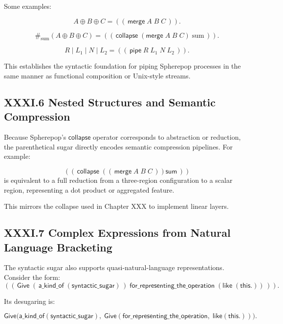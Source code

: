 \documentclass[11pt,letterpaper]{article}
\begin{document}
Some examples:

\[
A \oplus B \oplus C
=
((\,\mathsf{merge}\; A\; B\; C\,)).
\]

\[
\#_{\text{sum}}(A \oplus B \oplus C)
=
((\,\mathsf{collapse}\; (\mathsf{merge}\; A\; B\; C)\; \text{sum}\,)).
\]

\[
R \mid L_1 \mid N \mid L_2
=
((\,\mathsf{pipe}\; R\; L_1\; N\; L_2\,)).
\]

This establishes the syntactic foundation for piping Spherepop processes in the same manner as functional composition or Unix-style streams.

\subsection{XXXI.6 Nested Structures and Semantic Compression}

Because Spherepop's $\mathsf{collapse}$ operator corresponds to abstraction or reduction, the parenthetical sugar directly encodes semantic compression pipelines. For example:

\[
((\,\mathsf{collapse}\;
     ((\,\mathsf{merge}\; A\; B\; C\,))
     \mathsf{sum}\,))
\]
is equivalent to a full reduction from a three-region configuration to a scalar region, representing a dot product or aggregated feature.

This mirrors the collapse used in Chapter XXX to implement linear layers.

\subsection{XXXI.7 Complex Expressions from Natural Language Bracketing}

The syntactic sugar also supports quasi-natural-language representations. Consider the form:
\[
((\,\mathsf{Give}\;
       (\,\mathsf{a\_kind\_of}\;(\mathsf{syntactic\_sugar})\,)\;
       \mathsf{for\_representing\_the\_operation}\;
       (\mathsf{like}\;(\mathsf{this.}))\,)).
\]

Its desugaring is:

\[
\mathsf{Give}\Big(
     \mathsf{a\_kind\_of}(\mathsf{syntactic\_sugar}),\;
     \mathsf{Give}(
         \mathsf{for\_representing\_the\_operation},\;
         \mathsf{like}(\mathsf{this.})
     )
\Big).
\]
\end{document}
